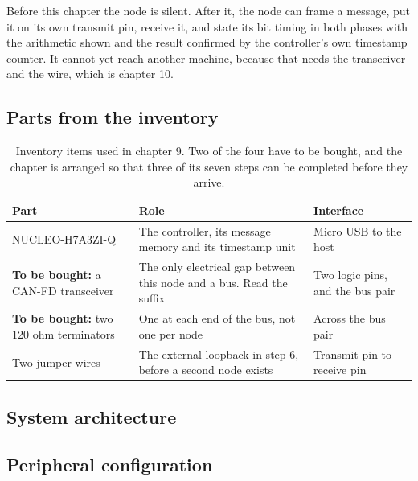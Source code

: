 Before this chapter the node is silent. After it, the node can frame a message,
put it on its own transmit pin, receive it, and state its bit timing in both
phases with the arithmetic shown and the result confirmed by the controller's
own timestamp counter. It cannot yet reach another machine, because that needs
the transceiver and the wire, which is chapter 10.

\subsection*{Parts from the inventory}

\begin{table}[H]\centering\small
\begin{tabular}{p{40mm}p{66mm}p{40mm}}
\toprule
Part & Role & Interface \\
\midrule
NUCLEO-H7A3ZI-Q & The controller, its message memory and its timestamp unit & Micro USB to the host \\
\textbf{To be bought:} a CAN-FD transceiver & The only electrical gap between this node and a bus. Read the suffix & Two logic pins, and the bus pair \\
\textbf{To be bought:} two 120 ohm terminators & One at each end of the bus, not one per node & Across the bus pair \\
Two jumper wires & The external loopback in step 6, before a second node exists & Transmit pin to receive pin \\
\bottomrule
\end{tabular}
\caption{Inventory items used in chapter 9. Two of the four have to be bought, and the chapter is arranged so that three of its seven steps can be completed before they arrive.}
\end{table}

\subsection*{System architecture}


\subsection*{Peripheral configuration}

